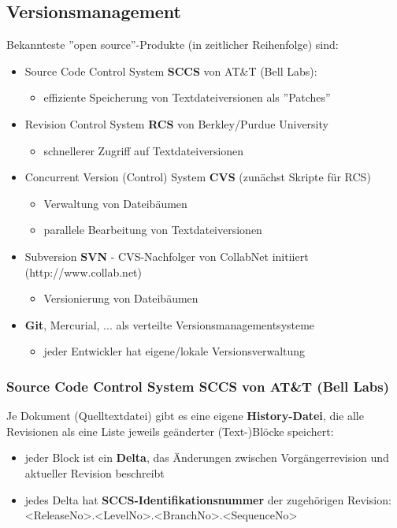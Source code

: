 \subsection{Versionsmanagement}
Bekannteste ''open source''-Produkte (in zeitlicher Reihenfolge) sind:
\begin{itemize}
	\item Source Code Control System \textbf{SCCS} von AT\&T (Bell Labs):
	\begin{itemize}
		\item effiziente Speicherung von Textdateiversionen als ''Patches''
	\end{itemize}
	\item Revision Control System \textbf{RCS} von Berkley/Purdue University
	\begin{itemize}
		\item schnellerer Zugriff auf Textdateiversionen
	\end{itemize}
	\item Concurrent Version (Control) System \textbf{CVS} (zunächst Skripte für RCS)
	\begin{itemize}
		\item Verwaltung von Dateibäumen
		\item parallele Bearbeitung von Textdateiversionen
	\end{itemize}
	\item Subversion \textbf{SVN} - CVS-Nachfolger von CollabNet initiiert (http://www.collab.net)
	\begin{itemize}
		\item Versionierung von Dateibäumen
	\end{itemize}
	\item \textbf{Git}, Mercurial, ... als verteilte Versionsmanagementsysteme
	\begin{itemize}
		\item jeder Entwickler hat eigene/lokale Versionsverwaltung
	\end{itemize}
\end{itemize}
\subsubsection{Source Code Control System SCCS von AT\&T (Bell Labs)}
Je Dokument (Quelltextdatei) gibt es eine eigene \textbf{History-Datei}, die alle Revisionen als eine Liste jeweils geänderter (Text-)Blöcke speichert:
\begin{itemize}
	\item jeder Block ist ein \textbf{Delta}, das Änderungen zwischen Vorgängerrevision und aktueller Revision beschreibt
	\item jedes Delta hat \textbf{SCCS-Identifikationsnummer} der zugehörigen Revision: <ReleaseNo>.<LevelNo>.<BranchNo>.<SequenceNo>
\end{itemize}

